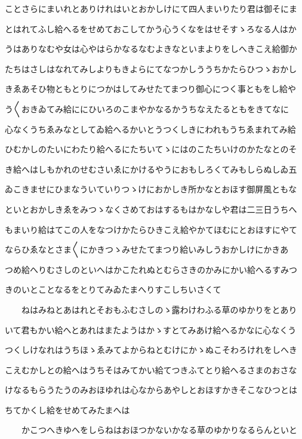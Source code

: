 \documentclass[a4paper,11pt,landscape]{ltjtarticle}
\begin{document}
\par\medskip
ことさらにまいれとありけれはいとおかしけにて四人まいりたり君は御そにま
\par\medskip
とはれてふし給へるをせめておこしてかう心うくなをはせそすゝろなる人はか
\par\medskip
うはありなむや女は心やはらかなるなむよきなといまよりをしへきこえ給御か
\par\medskip
たちはさしはなれてみしよりもきよらにてなつかしううちかたらひつゝおかし
\par\medskip
きゑあそひ物ともとりにつかはしてみせたてまつり御心につく事ともをし給や
\par\medskip
う〱おきゐてみ給ににひいろのこまやかなるかうちなえたるともをきてなに
\par\medskip
心なくうちゑみなとしてゐ給へるかいとうつくしきにわれもうちゑまれてみ給
\par\medskip
ひむかしのたいにわたり給へるにたちいてゝにはのこたちいけのかたなとのそ
\par\medskip
き給へはしもかれのせむさいゑにかけるやうにおもしろくてみもしらぬしゐ五
\par\medskip
ゐこきませにひまなういていりつゝけにおかしき所かなとおほす御屏風ともな
\par\medskip
といとおかしきゑをみつゝなくさめておはするもはかなしや君は二三日うちへ
\par\medskip
もまいり給はてこの人をなつけかたらひきこえ給やかてほむにとおほすにやて
\par\medskip
ならひゑなとさま〱にかきつゝみせたてまつり給いみしうおかしけにかきあ
\par\medskip
つめ給へりむさしのといへはかこたれぬとむらさきのかみにかい給へるすみつ
\par\medskip
きのいとことなるをとりてみゐたまへりすこしちいさくて
\par\medskip
　　ねはみねとあはれとそおもふむさしのゝ露わけわふる草のゆかりをとあり
\par\medskip
いて君もかい給へとあれはまたようはかゝすとてみあけ給へるかなに心なくう
\par\medskip
つくしけなれはうちほゝゑみてよからねとむけにかゝぬこそわろけれをしへき
\par\medskip
こえむかしとの給へはうちそはみてかい給てつきふてとり給へるさまのおさな
\par\medskip
けなるもらうたうのみおほゆれは心なからあやしとおほすかきそこなひつとは
\par\medskip
ちてかくし給をせめてみたまへは
\par\medskip
　　かこつへきゆへをしらねはおほつかないかなる草のゆかりなるらんといと
\end{document}
